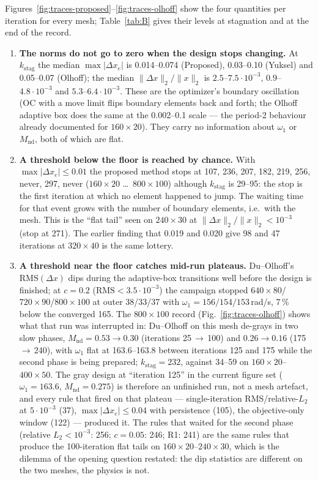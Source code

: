 \documentclass[11pt,a4paper]{article}
\newcommand{\Mnd}{M_{\mathrm{nd}}}
\newcommand{\kstag}{k_{\mathrm{stag}}}
\newcommand{\dx}{\Delta x}
\newcommand{\maxdx}{\max|\Delta x_e|}
\newcommand{\relL}{\|\Delta x\|_2/\|x\|_2}
\newcommand{\RMS}{\mathrm{RMS}}
\newcommand{\me}[2]{$#1\times#2$}
\begin{document}
Figures~\ref{fig:traces-proposed}--\ref{fig:traces-olhoff} show the four
quantities per iteration for every mesh; Table~\ref{tab:B} gives their levels at
stagnation and at the end of the record.

\begin{enumerate}
\item \textbf{The norms do not go to zero when the design stops changing.}
  At $\kstag$ the median $\maxdx$ is 0.014--0.074 (Proposed), 0.03--0.10
  (Yuksel) and 0.05--0.07 (Olhoff); the median $\relL$ is
  $2.5$--$7.5\cdot10^{-3}$, $0.9$--$4.8\cdot10^{-3}$ and
  $5.3$--$6.4\cdot10^{-3}$. These are the optimizer's boundary oscillation (OC
  with a move limit flips boundary elements back and forth; the Olhoff adaptive
  box does the same at the 0.002--0.1 scale --- the period-2 behaviour already
  documented for \me{160}{20}). They carry no information about $\omega_1$ or
  $\Mnd$, both of which are flat.

\item \textbf{A threshold below the floor is reached by chance.}
  With $\maxdx \le 0.01$ the proposed method stops at 107, 236, 207, 182, 219,
  256, never, 297, never (\me{160}{20} \ldots\ \me{800}{100}) although $\kstag$
  is 29--95: the stop is the first iteration at which no element happened to
  jump. The waiting time for that event grows with the number of boundary
  elements, i.e.\ with the mesh. This is the ``flat tail'' seen on \me{240}{30}
  at $\relL < 10^{-3}$ (stop at 271). The earlier finding that 0.019 and 0.020
  give 98 and 47 iterations at \me{320}{40} is the same lottery.

\item \textbf{A threshold near the floor catches mid-run plateaus.}
  Du--Olhoff's $\RMS(\dx)$ dips during the adaptive-box transitions well before
  the design is finished; at $c = 0.2$ ($\RMS < 3.5\cdot10^{-3}$) the campaign
  stopped \me{640}{80}/\me{720}{90}/\me{800}{100} at outer 38/33/37 with
  $\omega_1 = 156/154/153$\,rad/s, 7\,\% below the converged 165. The
  \me{800}{100} record (Fig.~\ref{fig:traces-olhoff}) shows what that run was
  interrupted in: Du--Olhoff on this mesh de-grays in two slow phases,
  $\Mnd = 0.53 \to 0.30$ (iterations 25\,$\to$\,100) and $0.26 \to 0.16$
  (175\,$\to$\,240), with $\omega_1$ flat at 163.6--163.8 between iterations 125
  and 175 while the second phase is being prepared; $\kstag = 232$, against
  34--59 on \me{160}{20}--\me{400}{50}. The gray design at ``iteration 125'' in
  the current figure set ($\omega_1 = 163.6$, $\Mnd = 0.275$) is therefore an
  unfinished run, not a mesh artefact, and every rule that fired on that
  plateau --- single-iteration RMS/relative-$L_2$ at $5\cdot10^{-3}$ (37),
  $\maxdx \le 0.04$ with persistence (105), the objective-only window (122) ---
  produced it. The rules that waited for the second phase (relative
  $L_2 < 10^{-3}$: 256; $c = 0.05$: 246; R1: 241) are the same rules that
  produce the 100-iteration flat tails on \me{160}{20}--\me{240}{30}, which is
  the dilemma of the opening question restated: the dip statistics are
  different on the two meshes, the physics is not.


\end{enumerate}
\end{document}
